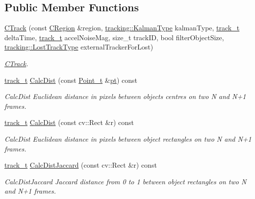 \subsection*{Public Member Functions}
\begin{DoxyCompactItemize}
\item 
\mbox{\hyperlink{class_c_track_a4c79152aa6d38a03c6fa80b2b3510808}{C\+Track}} (const \mbox{\hyperlink{class_c_region}{C\+Region}} \&region, \mbox{\hyperlink{namespacetracking_a83f2c4d58ea2737f7d6296dce3eb722a}{tracking\+::\+Kalman\+Type}} kalman\+Type, \mbox{\hyperlink{defines_8h_a7ce9c8817b42ab418e61756f579549ab}{track\+\_\+t}} delta\+Time, \mbox{\hyperlink{defines_8h_a7ce9c8817b42ab418e61756f579549ab}{track\+\_\+t}} accel\+Noise\+Mag, size\+\_\+t track\+ID, bool filter\+Object\+Size, \mbox{\hyperlink{namespacetracking_a5377d69122ad915004ef68a518d22be3}{tracking\+::\+Lost\+Track\+Type}} external\+Tracker\+For\+Lost)
\begin{DoxyCompactList}\small\item\em \mbox{\hyperlink{class_c_track}{C\+Track}}. \end{DoxyCompactList}\item 
\mbox{\hyperlink{defines_8h_a7ce9c8817b42ab418e61756f579549ab}{track\+\_\+t}} \mbox{\hyperlink{class_c_track_a7a3ba751123998349124ccaa2692acf5}{Calc\+Dist}} (const \mbox{\hyperlink{defines_8h_a8c42696da8f098b91374a8e8bb84b430}{Point\+\_\+t}} \&\mbox{\hyperlink{rings_8cpp_af69bbacaaf68a115b351c5d1e29c3cc8}{pt}}) const
\begin{DoxyCompactList}\small\item\em Calc\+Dist Euclidean distance in pixels between objects centres on two N and N+1 frames. \end{DoxyCompactList}\item 
\mbox{\hyperlink{defines_8h_a7ce9c8817b42ab418e61756f579549ab}{track\+\_\+t}} \mbox{\hyperlink{class_c_track_a4b354376efc03058801cbb84779d76ff}{Calc\+Dist}} (const cv\+::\+Rect \&r) const
\begin{DoxyCompactList}\small\item\em Calc\+Dist Euclidean distance in pixels between object rectangles on two N and N+1 frames. \end{DoxyCompactList}\item 
\mbox{\hyperlink{defines_8h_a7ce9c8817b42ab418e61756f579549ab}{track\+\_\+t}} \mbox{\hyperlink{class_c_track_a006369684909e91c26d11d0c2753b7ae}{Calc\+Dist\+Jaccard}} (const cv\+::\+Rect \&r) const
\begin{DoxyCompactList}\small\item\em Calc\+Dist\+Jaccard Jaccard distance from 0 to 1 between object rectangles on two N and N+1 frames. \end{DoxyCompactList}\item 

\end{DoxyCompactItemize}
